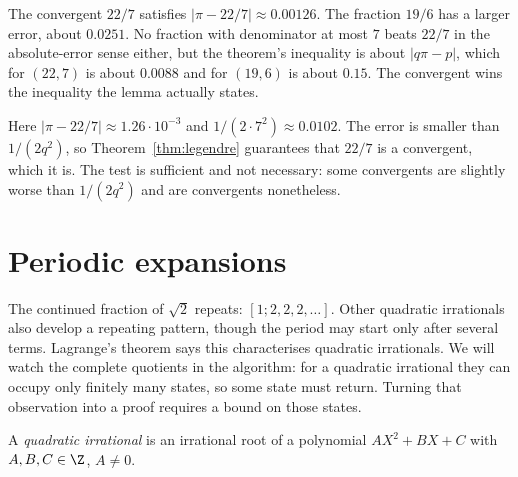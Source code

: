 \begin{examplex}
The convergent $22/7$ satisfies $|\pi-22/7|\approx 0.00126$. The fraction $19/6$ has a larger error, about $0.0251$. No fraction with denominator at most $7$ beats $22/7$ in the absolute-error sense either, but the theorem's inequality is about $|q\pi-p|$, which for $(22,7)$ is about $0.0088$ and for $(19,6)$ is about $0.15$. The convergent wins the inequality the lemma actually states.
\end{examplex}

\begin{examplex}
Here $|\pi-22/7|\approx 1.26\cdot 10^{-3}$ and $1/(2\cdot 7^2)\approx 0.0102$. The error is smaller than $1/(2q^2)$, so Theorem~\ref{thm:legendre} guarantees that $22/7$ is a convergent, which it is. The test is sufficient and not necessary: some convergents are slightly worse than $1/(2q^2)$ and are convergents nonetheless.
\end{examplex}

\section{Periodic expansions}

The continued fraction of $\sqrt2$ repeats: $[1;2,2,2,\ldots]$. Other quadratic irrationals also develop a repeating pattern, though the period may start only after several terms. Lagrange's theorem says this characterises quadratic irrationals. We will watch the complete quotients in the algorithm: for a quadratic irrational they can occupy only finitely many states, so some state must return. Turning that observation into a proof requires a bound on those states.

A \emph{quadratic irrational} is an irrational root of a polynomial $AX^2+BX+C$ with $A,B,C\in\Z$, $A\ne0$.

